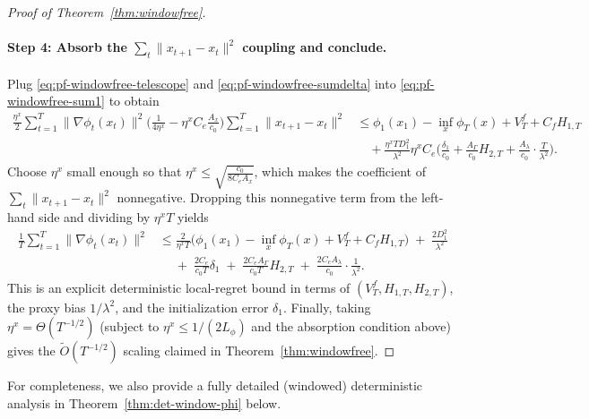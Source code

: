 \documentclass{uai2026} %
\begin{document}
\begin{proof}[Proof of Theorem~\ref{thm:windowfree}]
\paragraph{Step 4: Absorb the $\sum_t\|x_{t+1}-x_t\|^2$ coupling and conclude.}
Plug \eqref{eq:pf-windowfree-telescope} and \eqref{eq:pf-windowfree-sumdelta} into \eqref{eq:pf-windowfree-sum1} to obtain
\begin{align}
\frac{\eta^x}{2}\sum_{t=1}^T\|\nabla\phi_t(x_t)\|^2
\Big(\frac{1}{4\eta^x}-\eta^x C_e\frac{A_x}{c_0}\Big)\sum_{t=1}^T\|x_{t+1}-x_t\|^2
&\le \phi_1(x_1)-\inf_x\phi_T(x)+V_T^f+C_fH_{1,T}\nonumber\\
&\quad+\frac{\eta^xTD_1^2}{\lambda^2}
\eta^x C_e\Big(\frac{\delta_1}{c_0}+\frac{A_\Gamma}{c_0}H_{2,T}+\frac{A_\lambda}{c_0}\cdot\frac{T}{\lambda^2}\Big).
\label{eq:pf-windowfree-pre-final}
\end{align}
Choose $\eta^x$ small enough so that $\eta^x \le \sqrt{\frac{c_0}{8C_eA_x}}$, which makes the coefficient of
$\sum_t\|x_{t+1}-x_t\|^2$ nonnegative. Dropping this nonnegative term from the left-hand side and dividing by $\eta^x T$ yields
\begin{align}
\frac{1}{T}\sum_{t=1}^T\|\nabla\phi_t(x_t)\|^2
&\le
\frac{2}{\eta^xT}\Big(\phi_1(x_1)-\inf_x\phi_T(x)+V_T^f+C_fH_{1,T}\Big)
\;+\;\frac{2D_1^2}{\lambda^2}\nonumber\\
&\quad
\;+\;\frac{2C_e}{c_0T}\delta_1
\;+\;\frac{2C_eA_\Gamma}{c_0T}H_{2,T}
\;+\;\frac{2C_eA_\lambda}{c_0}\cdot\frac{1}{\lambda^2}.
\label{eq:pf-windowfree-final}
\end{align}
This is an explicit deterministic local-regret bound in terms of $(V_T^f,H_{1,T},H_{2,T})$, the proxy bias $1/\lambda^2$,
and the initialization error $\delta_1$.
Finally, taking $\eta^x=\Theta(T^{-1/2})$ (subject to $\eta^x\le 1/(2L_\phi)$ and the absorption condition above)
gives the $\tilde O(T^{-1/2})$ scaling claimed in Theorem~\ref{thm:windowfree}.
\end{proof}

For completeness, we also provide a fully detailed (windowed) deterministic analysis in Theorem~\ref{thm:det-window-phi} below.
\end{document}

